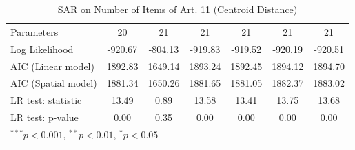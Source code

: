 \begin{table}[!h]
\begin{center}
\begin{tabular}{l c c c c c c }
Parameters              & 20           & 21           & 21           & 21           & 21           & 21           \\
Log Likelihood          & -920.67      & -804.13      & -919.83      & -919.52      & -920.19      & -920.51      \\
AIC (Linear model)      & 1892.83      & 1649.14      & 1893.24      & 1892.45      & 1894.12      & 1894.70      \\
AIC (Spatial model)     & 1881.34      & 1650.26      & 1881.65      & 1881.05      & 1882.37      & 1883.02      \\
LR test: statistic      & 13.49        & 0.89         & 13.58        & 13.41        & 13.75        & 13.68        \\
LR test: p-value        & 0.00         & 0.35         & 0.00         & 0.00         & 0.00         & 0.00         \\
\bottomrule
\multicolumn{7}{l}{\scriptsize{$^{***}p<0.001$, $^{**}p<0.01$, $^*p<0.05$}}
\end{tabular}
\caption{SAR on Number of Items of Art. 11 (Centroid Distance)}
\label{table:coefficients}
\end{center}
\end{table}
